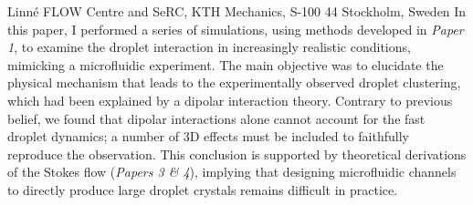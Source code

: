 %
%
%
%
%
%
%
\paperaffiliation
{%
  Linn\'e FLOW Centre and SeRC, KTH Mechanics, S-100 44 Stockholm, Sweden%
}%
%
%
%
%
%
\papernumber{}%
%
%
%
%
%
\papersummary%
{%
In this paper, I performed a series of simulations, using methods developed in \emph{Paper 1}, to examine the droplet interaction in increasingly realistic conditions, mimicking a microfluidic experiment. The main objective was to elucidate the physical mechanism that leads to the experimentally observed droplet clustering, which had been explained by a dipolar interaction theory. Contrary to previous belief, we found that dipolar interactions alone cannot account for the fast droplet dynamics; a number of 3D effects must be included to faithfully reproduce the observation. This conclusion is supported by theoretical derivations of the Stokes flow (\emph{Papers 3 \& 4}), implying that designing microfluidic channels to directly produce large droplet crystals remains difficult in practice.
}%
%
\graphicspath{{paper2/}}%
%
%
%
